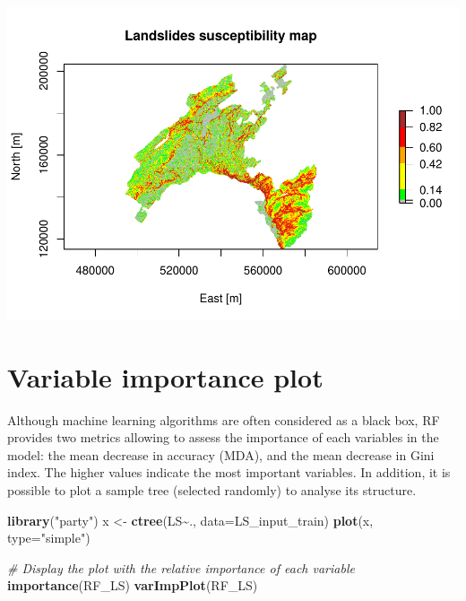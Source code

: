 \documentclass[
]{book}
\newenvironment{Shaded}{\begin{snugshade}}{\end{snugshade}}
\newcommand{\AttributeTok}[1]{\textcolor[rgb]{0.13,0.29,0.53}{#1}}
\newcommand{\CommentTok}[1]{\textcolor[rgb]{0.56,0.35,0.01}{\textit{#1}}}
\newcommand{\FunctionTok}[1]{\textcolor[rgb]{0.13,0.29,0.53}{\textbf{#1}}}
\newcommand{\NormalTok}[1]{#1}
\newcommand{\OtherTok}[1]{\textcolor[rgb]{0.56,0.35,0.01}{#1}}
\newcommand{\SpecialCharTok}[1]{\textcolor[rgb]{0.81,0.36,0.00}{\textbf{#1}}}
\newcommand{\StringTok}[1]{\textcolor[rgb]{0.31,0.60,0.02}{#1}}
\begin{document}
\includegraphics{06-RF_files/figure-latex/percentile-map-1.pdf}

\hypertarget{variable-importance-plot}{%
\section{Variable importance plot}\label{variable-importance-plot}}

Although machine learning algorithms are often considered as a black box, RF provides two metrics allowing to assess the importance of each variables in the model: the mean decrease in accuracy (MDA), and the mean decrease in Gini index.
The higher values indicate the most important variables.
In addition, it is possible to plot a sample tree (selected randomly) to analyse its structure.

\begin{Shaded}
\begin{Highlighting}[]
\FunctionTok{library}\NormalTok{(}\StringTok{"party"}\NormalTok{)}
\NormalTok{x }\OtherTok{\textless{}{-}} \FunctionTok{ctree}\NormalTok{(LS}\SpecialCharTok{\textasciitilde{}}\NormalTok{., }\AttributeTok{data=}\NormalTok{LS\_input\_train)}
\FunctionTok{plot}\NormalTok{(x, }\AttributeTok{type=}\StringTok{"simple"}\NormalTok{)}
\end{Highlighting}
\end{Shaded}

\begin{Shaded}
\begin{Highlighting}[]
\CommentTok{\# Display the plot with the relative importance of each variable}
\FunctionTok{importance}\NormalTok{(RF\_LS)}
\FunctionTok{varImpPlot}\NormalTok{(RF\_LS)}
\end{Highlighting}
\end{Shaded}
\end{document}
